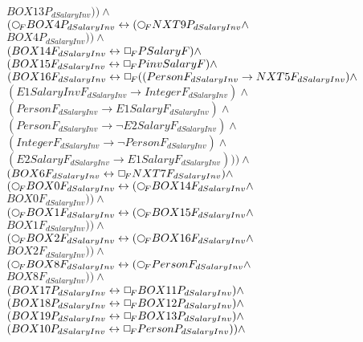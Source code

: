 \documentclass[a4paper,10pt]{article}
\begin{document}
 $ BOX13P_{dSalaryInv})) \land $ \\ 
 $ ( \Rnext BOX4P_{dSalaryInv} \leftrightarrow ( \Rnext NXT9P_{dSalaryInv} \land $ \\ 
 $ BOX4P_{dSalaryInv})) \land $ \\ 
 $ (BOX14F_{dSalaryInv} \leftrightarrow  \Box_{\!F} PSalaryF) \land $ \\ 
 $ (BOX15F_{dSalaryInv} \leftrightarrow  \Box_{\!F} PinvSalaryF) \land $ \\ 
 $ (BOX16F_{dSalaryInv} \leftrightarrow  \Box_{\!F} ((PersonF_{dSalaryInv} \rightarrow NXT5F_{dSalaryInv}) \land $ \\ 
 $ (E1SalaryInvF_{dSalaryInv} \rightarrow IntegerF_{dSalaryInv}) \land $ \\ 
 $ (PersonF_{dSalaryInv} \rightarrow E1SalaryF_{dSalaryInv}) \land $ \\ 
 $ (PersonF_{dSalaryInv} \rightarrow  \lnot E2SalaryF_{dSalaryInv}) \land $ \\ 
 $ (IntegerF_{dSalaryInv} \rightarrow  \lnot PersonF_{dSalaryInv}) \land $ \\ 
 $ (E2SalaryF_{dSalaryInv} \rightarrow E1SalaryF_{dSalaryInv}))) \land $ \\ 
 $ (BOX6F_{dSalaryInv} \leftrightarrow  \Box_{\!F} NXT7F_{dSalaryInv}) \land $ \\ 
 $ ( \Rnext BOX0F_{dSalaryInv} \leftrightarrow ( \Rnext BOX14F_{dSalaryInv} \land $ \\ 
 $ BOX0F_{dSalaryInv})) \land $ \\ 
 $ ( \Rnext BOX1F_{dSalaryInv} \leftrightarrow ( \Rnext BOX15F_{dSalaryInv} \land $ \\ 
 $ BOX1F_{dSalaryInv})) \land $ \\ 
 $ ( \Rnext BOX2F_{dSalaryInv} \leftrightarrow ( \Rnext BOX16F_{dSalaryInv} \land $ \\ 
 $ BOX2F_{dSalaryInv})) \land $ \\ 
 $ ( \Rnext BOX8F_{dSalaryInv} \leftrightarrow ( \Rnext PersonF_{dSalaryInv} \land $ \\ 
 $ BOX8F_{dSalaryInv})) \land $ \\ 
 $ (BOX17P_{dSalaryInv} \leftrightarrow  \Box_{\!F} BOX11P_{dSalaryInv}) \land $ \\ 
 $ (BOX18P_{dSalaryInv} \leftrightarrow  \Box_{\!F} BOX12P_{dSalaryInv}) \land $ \\ 
 $ (BOX19P_{dSalaryInv} \leftrightarrow  \Box_{\!F} BOX13P_{dSalaryInv}) \land $ \\ 
 $ (BOX10P_{dSalaryInv} \leftrightarrow  \Box_{\!F} PersonP_{dSalaryInv})) \land $ \\ 
\end{document}
